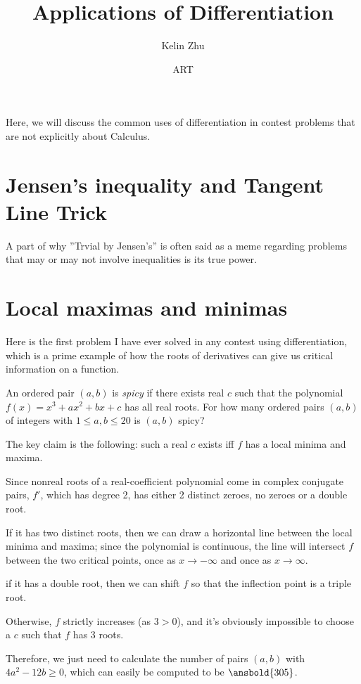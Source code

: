 \documentclass{article}
\title{Applications of Differentiation}
\author{Kelin Zhu}
\date{ART}
\begin{document}
\maketitle
Here, we will discuss the common uses of differentiation in contest problems that are not explicitly about Calculus.
\section{Jensen's inequality and Tangent Line Trick}
A part of why ''Trvial by Jensen's'' is often said as a meme regarding problems that may or may not involve inequalities is its true power.
\section{Local maximas and minimas}
Here is the first problem I have ever solved in any contest using differentiation, which is a prime example of how the roots of derivatives can give us critical information on a function.
\begin{exam}
An ordered pair $(a,b)$ is \textit{spicy} if there exists real $c$ such that the polynomial $f(x)=x^3+ax^2+bx+c$ has all real roots. For how many ordered pairs $(a,b)$ of integers with $1\le a,b\le 20$ is $(a,b)$ spicy?
\end{exam}
\begin{sol}
The key claim is the following: such a real $c$ exists iff $f$ has a local minima and maxima.

Since nonreal roots of a real-coefficient polynomial come in complex conjugate pairs, $f'$, which has degree 2, has either 2 distinct zeroes, no zeroes or a double root.

If it has two distinct roots, then we can draw a horizontal line between the local minima and maxima; since the polynomial is continuous, the line will intersect $f$ between the two critical points, once as $x\rightarrow -\infty$ and once as $x\rightarrow \infty$.

if it has a double root, then we can shift $f$ so that the inflection point is a triple root.

Otherwise, $f$ strictly increases (as $3>0$), and it's obviously impossible to choose a $c$ such that $f$ has 3 roots.

Therefore, we just need to calculate the number of pairs $(a,b)$ with $4a^2-12b\ge 0$, which can easily be computed to be $\ansbold{305}$.
\end{sol}
\end{document}
